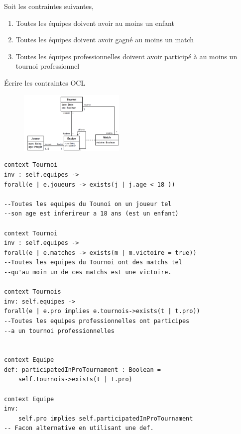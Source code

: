 \documentclass[16pt]{report}
\begin{document}
\begin{multicols*}{2}
            \begin{Exercice}{}{}
                Soit les contraintes suivantes, 
                \begin{enumerate}
                    \item Toutes les équipes doivent avoir au moins un enfant
                    \item Toutes les équipes doivent avoir gagné au moins un match
                    \item Toutes les équipes professionnelles doivent avoir participé à au moins 
                    un tournoi professionnel
                \end{enumerate}
                Écrire les contraintes OCL
            \end{Exercice}
        

            \begin{figure}[H]
                \begin{center}
                    \includegraphics[width=0.45\textwidth]{ClassDExo2.png}
                \end{center}
            \end{figure}

\begin{lstlisting}
context Tournoi 
inv : self.equipes -> 
forall(e | e.joueurs -> exists(j | j.age < 18 ))

--Toutes les equipes du Tounoi on un joueur tel 
--son age est inferireur a 18 ans (est un enfant)

context Tournoi 
inv : self.equipes -> 
forall(e | e.matches -> exists(m | m.victoire = true))
--Toutes les equipes du Tournoi ont des matchs tel 
--qu'au moin un de ces matchs est une victoire.

context Tournois 
inv: self.equipes ->
forall(e | e.pro implies e.tournois->exists(t | t.pro))
--Toutes les equipes professionnelles ont participes 
--a un tournoi professionnelles


context Equipe
def: participatedInProTournament : Boolean = 
    self.tournois->exists(t | t.pro)

context Equipe
inv: 
    self.pro implies self.participatedInProTournament
-- Facon alternative en utilisant une def.



\end{lstlisting}
\end{multicols*}
\end{document}
